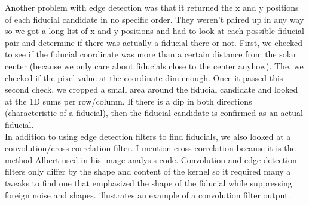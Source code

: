 \documentclass[10pt]{scrartcl}
\begin{document}
Another problem with edge detection was that it returned the x and y positions of each fiducial candidate in no specific order. They weren't paired up in any way so we got a long list of x and y positions and had to look at each possible fiducial pair and determine if there was actually a fiducial there or not. First, we checked to see if the fiducial coordinate was more than a certain distance from the solar center (because we only care about fiducials close to the center anyhow). The, we checked if the pixel value at the coordinate dim enough. Once it passed this second check, we cropped a small area around the fiducial candidate and looked at the 1D sums per row/column. If there is a dip in both directions (characteristic of a fiducial), then the fiducial candidate is confirmed as an actual fiducial.\\

In addition to using edge detection filters to find fiducials, we also looked at a convolution/cross correlation filter. I mention cross correlation because it is the method Albert used in his image analysis code. Convolution and edge detection filters only differ by the shape and content of the kernel so it required many a tweaks to find one that emphasized the shape of the fiducial while suppressing foreign noise and shapes.  illustrates an example of a convolution filter output.

\end{document}
